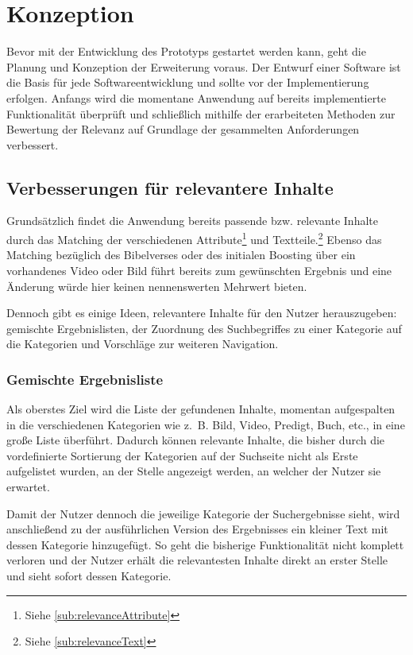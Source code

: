 \chapter{Konzeption}
\label{ch:conception}
Bevor mit der Entwicklung des Prototyps gestartet werden kann, geht die Planung und Konzeption der Erweiterung voraus.
Der Entwurf einer Software ist die Basis für jede Softwareentwicklung und sollte vor der Implementierung erfolgen.
Anfangs wird die momentane Anwendung auf bereits implementierte Funktionalität überprüft und schließlich mithilfe der erarbeiteten Methoden zur Bewertung der Relevanz auf Grundlage der gesammelten Anforderungen verbessert.

\section{Verbesserungen für relevantere Inhalte}
\label{sec:potential}

Grundsätzlich findet die Anwendung bereits passende bzw. relevante Inhalte durch das Matching der verschiedenen Attribute\footnote{Siehe \ref{sub:relevanceAttribute}} und Textteile.\footnote{Siehe \ref{sub:relevanceText}}
Ebenso das Matching bezüglich des Bibelverses oder des initialen Boosting über ein vorhandenes Video oder Bild führt bereits zum gewünschten Ergebnis und eine Änderung würde hier keinen nennenswerten Mehrwert bieten.

Dennoch gibt es einige Ideen, relevantere Inhalte für den Nutzer herauszugeben: gemischte Ergebnislisten, der Zuordnung des Suchbegriffes zu einer Kategorie auf die Kategorien und Vorschläge zur weiteren Navigation.

\subsection{Gemischte Ergebnisliste}
\label{sub:unifiedList}
Als oberstes Ziel wird die Liste der gefundenen Inhalte, momentan aufgespalten in die verschiedenen Kategorien wie z. B. Bild, Video, Predigt, Buch, etc., in eine große Liste überführt.
Dadurch können relevante Inhalte, die bisher durch die vordefinierte Sortierung der Kategorien auf der Suchseite nicht als Erste aufgelistet wurden, an der Stelle angezeigt werden, an welcher der Nutzer sie erwartet.

Damit der Nutzer dennoch die jeweilige Kategorie der Suchergebnisse sieht, wird anschließend zu der ausführlichen Version des Ergebnisses ein kleiner Text mit dessen Kategorie hinzugefügt.
So geht die bisherige Funktionalität nicht komplett verloren und der Nutzer erhält die relevantesten Inhalte direkt an erster Stelle und sieht sofort dessen Kategorie.

